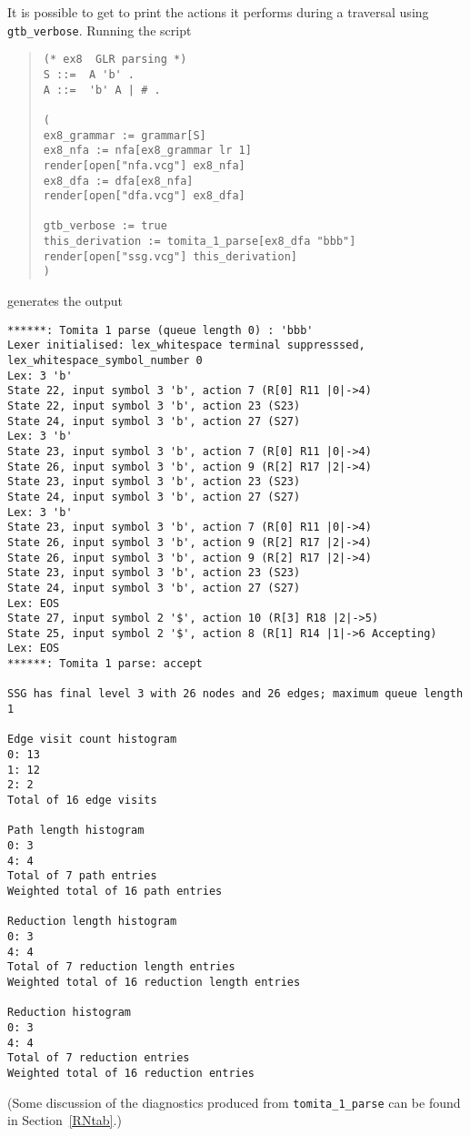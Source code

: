It is possible to get \gtb to print the actions it performs during a
traversal using \verb+gtb_verbose+. Running the script
\begin{quote}
\begin{verbatim}
(* ex8  GLR parsing *)
S ::=  A 'b' .
A ::=  'b' A | # .

(
ex8_grammar := grammar[S]
ex8_nfa := nfa[ex8_grammar lr 1]
render[open["nfa.vcg"] ex8_nfa]
ex8_dfa := dfa[ex8_nfa]
render[open["dfa.vcg"] ex8_dfa]

gtb_verbose := true
this_derivation := tomita_1_parse[ex8_dfa "bbb"]
render[open["ssg.vcg"] this_derivation]
)
\end{verbatim}
\end{quote}
generates the output\label{verb}
{\small
\begin{verbatim}
******: Tomita 1 parse (queue length 0) : 'bbb'
Lexer initialised: lex_whitespace terminal suppresssed, 
lex_whitespace_symbol_number 0
Lex: 3 'b'
State 22, input symbol 3 'b', action 7 (R[0] R11 |0|->4)
State 22, input symbol 3 'b', action 23 (S23)
State 24, input symbol 3 'b', action 27 (S27)
Lex: 3 'b'
State 23, input symbol 3 'b', action 7 (R[0] R11 |0|->4)
State 26, input symbol 3 'b', action 9 (R[2] R17 |2|->4)
State 23, input symbol 3 'b', action 23 (S23)
State 24, input symbol 3 'b', action 27 (S27)
Lex: 3 'b'
State 23, input symbol 3 'b', action 7 (R[0] R11 |0|->4)
State 26, input symbol 3 'b', action 9 (R[2] R17 |2|->4)
State 26, input symbol 3 'b', action 9 (R[2] R17 |2|->4)
State 23, input symbol 3 'b', action 23 (S23)
State 24, input symbol 3 'b', action 27 (S27)
Lex: EOS
State 27, input symbol 2 '$', action 10 (R[3] R18 |2|->5)
State 25, input symbol 2 '$', action 8 (R[1] R14 |1|->6 Accepting)
Lex: EOS
******: Tomita 1 parse: accept

SSG has final level 3 with 26 nodes and 26 edges; maximum queue length 1

Edge visit count histogram
0: 13
1: 12
2: 2
Total of 16 edge visits

Path length histogram
0: 3
4: 4
Total of 7 path entries
Weighted total of 16 path entries

Reduction length histogram
0: 3
4: 4
Total of 7 reduction length entries
Weighted total of 16 reduction length entries

Reduction histogram
0: 3
4: 4
Total of 7 reduction entries
Weighted total of 16 reduction entries
\end{verbatim}
}
(Some discussion of the diagnostics produced from
\verb+tomita_1_parse+ can be found in Section~\ref{RNtab}.)


